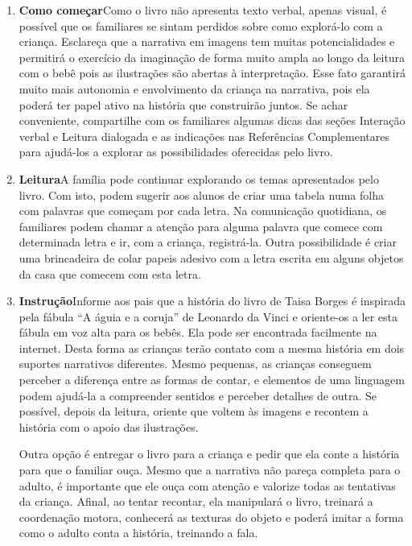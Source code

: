 \documentclass[11pt]{extarticle}
\begin{document}
\begin{enumerate}
\item \textbf{Como começar}\quad Como o livro não apresenta 
texto verbal, apenas visual, é possível que os familiares se sintam 
perdidos sobre como explorá-lo com a criança. Esclareça que a narrativa 
em imagens tem muitas potencialidades e permitirá o exercício da imaginação 
de forma muito ampla ao longo da leitura com o bebê pois as ilustrações são 
abertas à interpretação. Esse fato garantirá muito mais autonomia e 
envolvimento da criança na narrativa, pois ela poderá ter papel ativo na 
história que construirão juntos. Se achar conveniente, compartilhe com 
os familiares algumas dicas das seções Interação verbal 
e Leitura dialogada e as indicações nas Referências Complementares 
para ajudá-los a explorar as possibilidades oferecidas pelo livro. 

\item \textbf{Leitura}\quad A família pode continuar 
explorando os temas apresentados pelo livro. Com isto, podem sugerir
aos alunos de criar uma tabela numa folha com palavras que começam por cada
letra. Na comunicação quotidiana, os familiares podem chamar a atenção para
alguma palavra que comece com determinada letra e ir, com a criança, 
registrá-la. Outra possibilidade é criar uma brincadeira de colar papeis 
adesivo com a letra escrita em alguns objetos da casa que comecem com esta letra. 

\item \textbf{Instrução}\quad Informe aos pais que a 
história do livro de Taisa Borges é inspirada pela fábula “A águia e a coruja” 
de Leonardo da Vinci e oriente-os a ler esta fábula em voz alta para os 
bebês. Ela pode ser encontrada facilmente na internet. Desta forma as 
crianças terão contato com a mesma história em dois suportes narrativos 
diferentes. Mesmo pequenas, as crianças conseguem perceber a diferença entre 
as formas de contar, e elementos de uma linguagem podem ajudá-la a compreender 
sentidos e perceber detalhes de outra. Se possível, depois da leitura, oriente 
que voltem às imagens e recontem a história com o apoio das 
ilustrações. 

Outra opção é entregar o livro para a criança e pedir que ela conte 
a história para que o familiar ouça. Mesmo que a narrativa não pareça 
completa para o adulto, é importante que ele ouça com atenção e 
valorize todas as tentativas da criança. Afinal, ao tentar recontar, 
ela manipulará o livro, treinará a coordenação motora, conhecerá as texturas 
do objeto e poderá imitar a forma como o adulto 
conta a história, treinando a fala. 
\end{enumerate}
\end{document}
